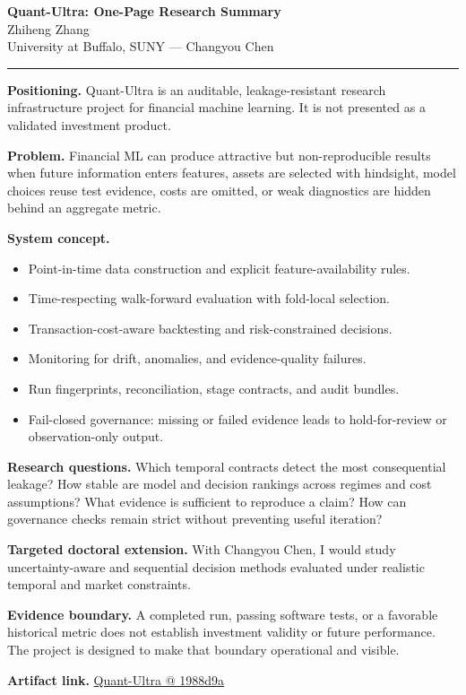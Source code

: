 \documentclass[11pt]{article}
\makeatletter
\newcommand{\ApplicantName}{Zhiheng Zhang}
\newcommand{\ApplicantGitHub}{\href{https://github.com/zhiheng-zhang-Mera/Quant-Ultra/tree/1988d9a8530da91a8158de864d098ea869098923}{Quant-Ultra @ 1988d9a}}
\makeatother
\begin{document}
\begin{center}
{\LARGE\bfseries Quant-Ultra: One-Page Research Summary}\\[0.25em]
{\large \ApplicantName}\\
University at Buffalo, SUNY --- Changyou Chen
\end{center}
\vspace{0.35em}\hrule\vspace{0.65em}

\textbf{Positioning.} Quant-Ultra is an auditable, leakage-resistant research infrastructure project for financial machine learning. It is not presented as a validated investment product.

\textbf{Problem.} Financial ML can produce attractive but non-reproducible results when future information enters features, assets are selected with hindsight, model choices reuse test evidence, costs are omitted, or weak diagnostics are hidden behind an aggregate metric.

\textbf{System concept.}
\begin{itemize}
\item Point-in-time data construction and explicit feature-availability rules.
\item Time-respecting walk-forward evaluation with fold-local selection.
\item Transaction-cost-aware backtesting and risk-constrained decisions.
\item Monitoring for drift, anomalies, and evidence-quality failures.
\item Run fingerprints, reconciliation, stage contracts, and audit bundles.
\item Fail-closed governance: missing or failed evidence leads to hold-for-review or observation-only output.
\end{itemize}

\textbf{Research questions.} Which temporal contracts detect the most consequential leakage? How stable are model and decision rankings across regimes and cost assumptions? What evidence is sufficient to reproduce a claim? How can governance checks remain strict without preventing useful iteration?

\textbf{Targeted doctoral extension.} With Changyou Chen, I would study uncertainty-aware and sequential decision methods evaluated under realistic temporal and market constraints.

\textbf{Evidence boundary.} A completed run, passing software tests, or a favorable historical metric does not establish investment validity or future performance. The project is designed to make that boundary operational and visible.

\textbf{Artifact link.} \ApplicantGitHub
\end{document}
